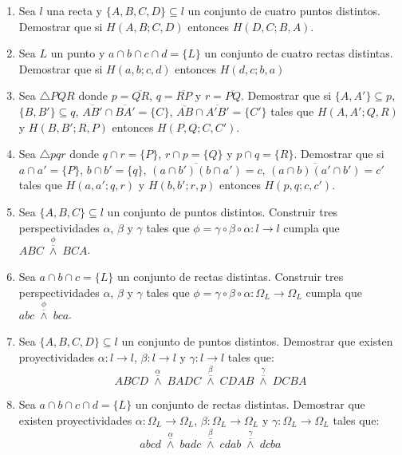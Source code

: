 \documentclass[12pt]{report}
\numberwithin{section}{chapter}
\begin{document}
\begin{enumerate}
\item Sea $l$ una recta y $\{A,B,C,D\} \subseteq l$ un conjunto de cuatro puntos distintos. Demostrar que si $H(A,B;C,D)$ entonces $H(D,C; B,A)$.

\item Sea $L$ un punto y $a\cap b\cap c\cap d =\{L\}$ un conjunto de cuatro rectas distintas. Demostrar que si $H(a,b;c,d)$ entonces $H(d,c; b,a)$

\item Sea $\triangle PQR$ donde $p = \overline{QR}$, $q=\overline{RP}$ y $r=\overline{PQ}$. Demostrar que si $\{A,A'\}\subseteq p$, $\{B, B'\}\subseteq q$, $\overline{AB'}\cap\overline{BA'}=\{C\}$, $\overline{AB}\cap\overline{A'B'}=\{C'\}$ tales que $H(A,A';Q,R)$ y $H(B,B';R,P)$ entonces $H(P,Q;C,C')$.

\item Sea $\triangle pqr$ donde $q \cap r= \{P\}$, $r \cap p =\{Q\}$ y $p \cap q =\{R\}$. Demostrar que si $a \cap a' = \{P\}$, $b \cap b' = \{q\}$, $\overline{(a \cap b')(b \cap a')}=c$, $\overline{(a \cap b)(a' \cap b')}=c'$ tales que $H(a,a';q,r)$ y $H(b,b';r,p)$ entonces $H(p,q;c,c')$.

\item Sea $\{A,B,C\}\subseteq l$ un conjunto de puntos distintos. Construir tres perspectividades $\alpha$, $\beta$ y $\gamma$ tales que $\phi=\gamma \circ \beta \circ \alpha: l \to l$ cumpla que $ABC\;\overset{\phi}{\overline{\wedge}}\; BCA$.

\item Sea $a \cap b \cap c = \{L\}$ un conjunto de rectas distintas. Construir tres perspectividades $\alpha$, $\beta$ y $\gamma$ tales que $\phi=\gamma \circ \beta \circ \alpha: \Omega_L \to \Omega_L$ cumpla que $abc\;\overset{\phi}{\overline{\wedge}}\; bca$.

\item Sea $\{A,B,C,D\}\subseteq l$ un conjunto de puntos distintos. Demostrar que existen proyectividades $\alpha: l \to l$, $\beta: l \to l$ y $\gamma:l \to l$ tales que:
$$ABCD\; \overset{\alpha}{\overline{\wedge}}\; BADC\; \overset{\beta}{\overline{\wedge}}\; CDAB \; \overset{\gamma}{\overline{\wedge}}\;DCBA$$

\item Sea $a \cap b \cap c \cap d =\{L\}$ un conjunto de rectas distintas. Demostrar que existen proyectividades $\alpha: \Omega_L \to \Omega_L$, $\beta: \Omega_L \to \Omega_L$ y $\gamma:\Omega_L \to \Omega_L$ tales que:
$$abcd\; \overset{\alpha}{\overline{\wedge}}\; badc\; \overset{\beta}{\overline{\wedge}}\; cdab \; \overset{\gamma}{\overline{\wedge}}\;dcba$$


\end{enumerate}
\end{document}
